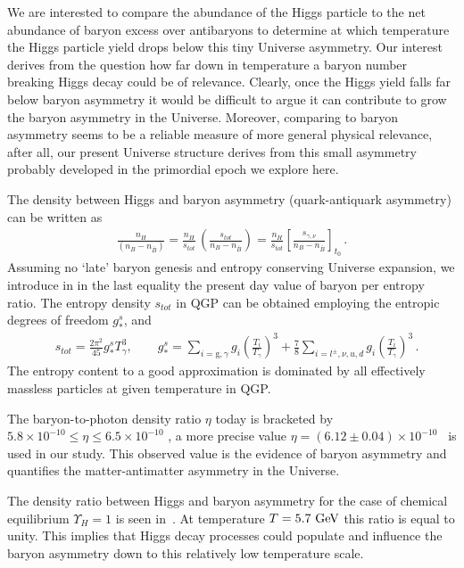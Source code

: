 We are interested to compare the abundance of the Higgs particle to the net abundance of baryon excess over antibaryons to determine at which temperature the Higgs particle yield drops below this tiny Universe asymmetry. Our interest derives from the question how far down in temperature a baryon number breaking Higgs decay could be of relevance. Clearly, once the Higgs yield falls far below baryon asymmetry it would be difficult to argue it can contribute to grow the baryon asymmetry in the Universe. Moreover, comparing to baryon asymmetry seems to be a reliable measure of more general physical relevance, after all, our present Universe structure derives from this small asymmetry probably developed in the primordial epoch we explore here. 
 
The density between Higgs and baryon asymmetry (quark-antiquark asymmetry) can be written as
\begin{align}
\frac{n_H}{(n_B-n_{\bar{B}})}=\frac{n_{H}}{s_{tot}}\,\left(\frac{s_{tot}}{n_B-n_{\bar{B}}}\right)=
\frac{n_{H}}{s_{tot}}\left[\frac{s_{\gamma,\nu}}{n_B-n_{\bar{B}}}\right]_{t_0}\,.
\end{align}
Assuming no `late' baryon genesis and entropy conserving Universe expansion, we introduce in  in the last equality the present day value of baryon per entropy ratio. The entropy density $s_{tot}$ in QGP can be obtained employing the entropic degrees of freedom $g^s_\ast$,  and~
\begin{align}
 &s_{tot}=\frac{2\pi^2}{45}g^s_\ast T_\gamma^3,\qquad g^s_\ast=\sum_{i=\mathrm{g},\gamma}g_i\left({\frac{T_i}{T_\gamma}}\right)^3+\frac{7}{8}\sum_{i=l^\pm,\nu,u,d}g_i\left({\frac{T_i}{T_\gamma}}\right)^3\,.
\end{align}
The entropy content to a good approximation is dominated by all effectively massless particles at given temperature in QGP. 

The baryon-to-photon density ratio $\eta$ today is bracketed by $5.8\times10^{-10} \leqslant\eta\leqslant6.5\times10^{-10}$ \cite{ParticleDataGroup:2018ovx}, a more precise value $\eta=(6.12\pm0.04)\times10^{-10}$~\cite{ParticleDataGroup:2022pth} is used in our study. This observed value is the evidence of baryon asymmetry and quantifies the matter-antimatter asymmetry in the Universe.

The density ratio between Higgs and baryon asymmetry for the case of chemical equilibrium $\Upsilon_H=1$ is seen in~. At temperature $T=5.7\text{ GeV}$ this ratio is equal to unity. This implies that Higgs decay processes could populate and influence the baryon asymmetry down to this relatively low temperature scale. 

